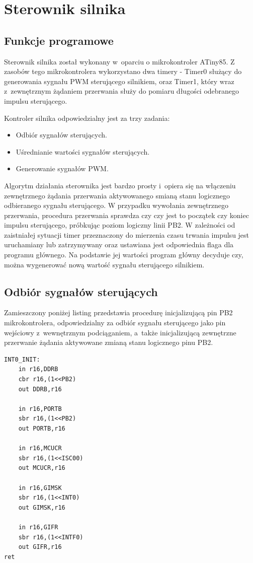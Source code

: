 \section{Sterownik silnika}
\subsection{Funkcje programowe}
Sterownik silnika został wykonany w~oparciu o mikrokontroler ATiny85. Z zasobów tego mikrokontrolera wykorzystano dwa timery - Timer0 służący do generowania sygnału PWM sterującego silnikiem, oraz Timer1, który wraz z~zewnętrznym żądaniem przerwania służy do pomiaru długości odebranego impulsu sterującego.

Kontroler silnika odpowiedzialny jest za trzy zadania:
\begin{itemize}
	\item Odbiór sygnałów sterujących.
	\item Uśrednianie wartości sygnałów sterujących.
	\item Generowanie sygnałów PWM.
\end{itemize}

Algorytm działania sterownika jest bardzo prosty i~opiera się na włączeniu zewnętrznego żądania przerwania aktywowanego smianą stanu logicznego odbieranego sygnału sterującego. W przypadku wywołania zewnętrznego przerwania, procedura przerwania sprawdza czy czy jest to początek czy koniec impulsu sterującego, próbkując poziom logiczny linii PB2. W zależności od zaistniałej sytuacji timer przeznaczony do mierzenia czasu trwania impulsu jest uruchamiany lub zatrzymywany oraz ustawiana jest odpowiednia flaga dla programu głównego. Na podstawie jej wartości program główny decyduje czy, można wygenerować nową wartość sygnału sterującego silnikiem.


\subsection{Odbiór sygnałów sterujących}

Zamieszczony poniżej listing przedstawia procedurę inicjalizującą pin PB2 mikrokontrolera, odpowiedzialny za odbiór sygnału sterującego jako pin wejściowy z~wewnętrznym podciąganiem, a~także inicjalizującą zewnętrzne przerwanie żądania aktywowane zmianą stanu logicznego pinu PB2. 

\begin{lstlisting}
INT0_INIT:
	in r16,DDRB
	cbr r16,(1<<PB2)
	out DDRB,r16	

	in r16,PORTB
	sbr r16,(1<<PB2)
	out PORTB,r16

	in r16,MCUCR
	sbr r16,(1<<ISC00)
	out MCUCR,r16

	in r16,GIMSK
	sbr r16,(1<<INT0)
	out GIMSK,r16

	in r16,GIFR
	sbr r16,(1<<INTF0)
	out GIFR,r16
ret
\end{lstlisting}


